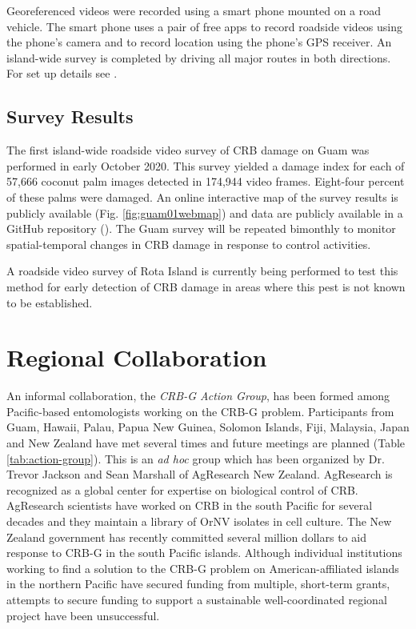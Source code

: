 \documentclass[12pt,
letterpaper,english,bibliography=totocnumbered, abstract=on]{scrartcl}
\begin{document}
Georeferenced videos were recorded using a smart phone mounted on a road vehicle. The smart phone uses a pair of free apps to record roadside videos using the phone's camera and to record location using the phone's GPS receiver. An island-wide survey is completed by driving all major routes in both directions.  For set up details see \cite{aubreymooreSetAutomatedRoadside2020}.

\subsection{Survey Results}

The first island-wide roadside video survey of CRB damage on Guam was performed in early October 2020.  This survey yielded a damage index for each of 57,666 coconut palm images detected in 174,944 video frames. Eight-four percent of these palms were damaged. An online interactive map of the survey results is publicly available (Fig. \ref{fig:guam01webmap}) and data are publicly available in a GitHub repository (\cite{mooreGitHubRepositoryGuamCRBdamagemap2020102020}). The Guam survey will be repeated bimonthly to monitor spatial-temporal changes in CRB damage in response to control activities.

A roadside video survey of Rota Island is currently being performed to test this method for early detection of CRB damage in areas where this pest is not known to be established.

\section{Regional Collaboration}

An informal collaboration, the \textit{CRB-G Action Group}, has been formed among Pacific-based entomologists working on the CRB-G problem. Participants from Guam, Hawaii, Palau, Papua New Guinea, Solomon Islands, Fiji, Malaysia, Japan and New Zealand have met several times and future meetings are planned (Table \ref{tab:action-group}).  This is an \textit{ad hoc} group which has been organized by Dr. Trevor Jackson and Sean Marshall of AgResearch New Zealand. AgResearch is recognized as a global center for expertise on biological control of CRB. AgResearch scientists have worked on CRB in the south Pacific for several decades and they maintain a library of OrNV isolates in cell culture. The New Zealand government has recently committed several million dollars to aid response to CRB-G in the south Pacific islands. Although individual institutions working to find a solution to the CRB-G problem on American-affiliated islands in the northern Pacific have secured funding from multiple, short-term grants, attempts to secure funding to support a sustainable well-coordinated regional project have been unsuccessful. 
\end{document}
